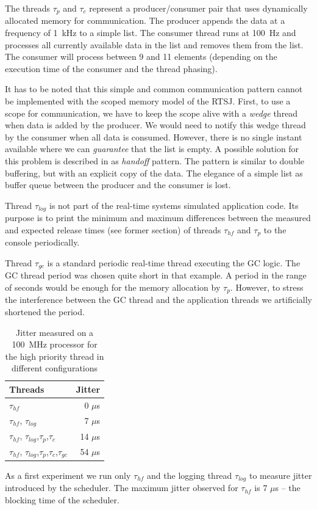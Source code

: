The threads $\tau_{p}$ and $\tau_{c}$ represent a producer/consumer
pair that uses dynamically allocated memory for communication. The
producer appends the data at a frequency of 1~kHz to a simple list.
The consumer thread runs at 100~Hz and processes all currently
available data in the list and removes them from the list. The
consumer will process between 9 and 11 elements (depending on the
execution time of the consumer and the thread phasing).

It has to be noted that this simple and common communication pattern
cannot be implemented with the scoped memory model of the RTSJ.
First, to use a scope for communication, we have to keep the scope
alive with a \emph{wedge} thread \cite{conf/isorc/PizloFHV04} when
data is added by the producer. We would need to notify this wedge
thread by the consumer when all data is consumed. However, there is
no single instant available where we can \emph{guarantee} that the
list is empty. A possible solution for this problem is described in
\cite{conf/isorc/PizloFHV04} as \emph{handoff} pattern. The pattern
is similar to double buffering, but with an explicit copy of the
data. The elegance of a simple list as buffer queue between the
producer and the consumer is lost.

Thread $\tau_{log}$ is not part of the real-time systems simulated
application code. Its purpose is to print the minimum and maximum
differences between the measured and expected release times (see
former section) of threads $\tau_{hf}$ and $\tau_{p}$ to the console
periodically.

Thread $\tau_{gc}$ is a standard periodic real-time thread executing
the GC logic. The GC thread period was chosen quite short in that
example. A period in the range of seconds would be enough for the
memory allocation by $\tau_{p}$. However, to stress the interference
between the GC thread and the application threads we artificially
shortened the period.

\begin{table}
    \centering
    \begin{tabular}{lr}
    \toprule
    Threads & Jitter \\
    \midrule
    $\tau_{hf}$ & 0 $\mu$s \\
    $\tau_{hf}$, $\tau_{log}$ & 7 $\mu$s \\
    $\tau_{hf}$, $\tau_{log}$,$\tau_{p}$,$\tau_{c}$ & 14 $\mu$s \\
    $\tau_{hf}$, $\tau_{log}$,$\tau_{p}$,$\tau_{c}$,$\tau_{gc}$ & 54 $\mu$s \\
    \bottomrule
    \end{tabular}
    \caption{Jitter measured on a 100~MHz processor for the high priority thread in different configurations}
    \label{tab:jitter}
\end{table}
As a first experiment we run only $\tau_{hf}$ and the logging thread
$\tau_{log}$ to measure jitter introduced by the scheduler. The
maximum jitter observed for $\tau_{hf}$ is 7 $\mu$s -- the blocking
time of the scheduler.

